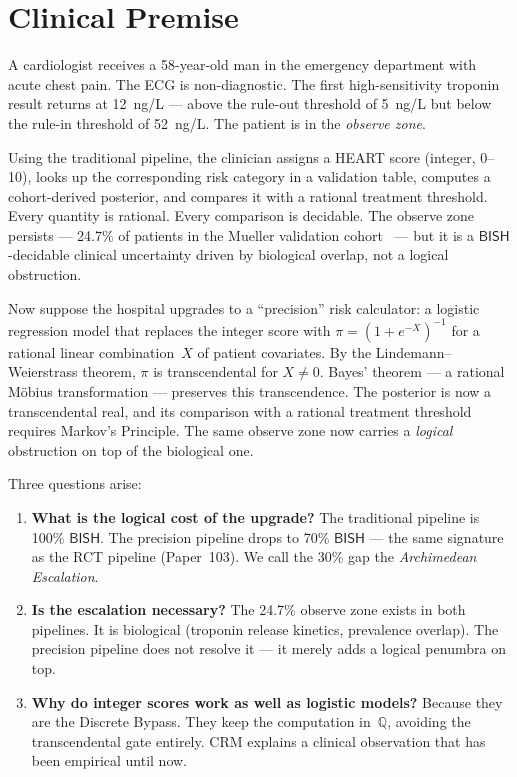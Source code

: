 \documentclass[11pt,a4paper]{article}
\theoremstyle{plain}
\theoremstyle{definition}
\newcommand{\BISH}{\textsf{BISH}}
\newcommand{\Q}{\mathbb{Q}}
\begin{document}
\section{Clinical Premise}\label{sec:premise}

A cardiologist receives a 58-year-old man in the emergency department with acute chest pain.  The ECG is non-diagnostic.  The first high-sensitivity troponin result returns at 12~ng/L --- above the rule-out threshold of 5~ng/L but below the rule-in threshold of 52~ng/L.  The patient is in the \emph{observe zone}.

Using the traditional pipeline, the clinician assigns a HEART score (integer, 0--10), looks up the corresponding risk category in a validation table, computes a cohort-derived posterior, and compares it with a rational treatment threshold.  Every quantity is rational.  Every comparison is decidable.  The observe zone persists --- 24.7\% of patients in the Mueller validation cohort~\cite{mueller2019} --- but it is a $\BISH$-decidable clinical uncertainty driven by biological overlap, not a logical obstruction.

Now suppose the hospital upgrades to a ``precision'' risk calculator: a logistic regression model that replaces the integer score with $\pi = (1 + e^{-X})^{-1}$ for a rational linear combination~$X$ of patient covariates.  By the Lindemann--Weierstrass theorem, $\pi$ is transcendental for $X \neq 0$.  Bayes' theorem --- a rational M\"obius transformation --- preserves this transcendence.  The posterior is now a transcendental real, and its comparison with a rational treatment threshold requires Markov's Principle.  The same observe zone now carries a \emph{logical} obstruction on top of the biological one.

Three questions arise:

\begin{enumerate}[nosep]
\item \textbf{What is the logical cost of the upgrade?}  The traditional pipeline is 100\% $\BISH$.  The precision pipeline drops to 70\% $\BISH$ --- the same signature as the RCT pipeline (Paper~103).  We call the 30\% gap the \emph{Archimedean Escalation}.

\item \textbf{Is the escalation necessary?}  The 24.7\% observe zone exists in both pipelines.  It is biological (troponin release kinetics, prevalence overlap).  The precision pipeline does not resolve it --- it merely adds a logical penumbra on top.

\item \textbf{Why do integer scores work as well as logistic models?}  Because they are the Discrete Bypass.  They keep the computation in~$\Q$, avoiding the transcendental gate entirely.  CRM explains a clinical observation that has been empirical until now.
\end{enumerate}
\end{document}
